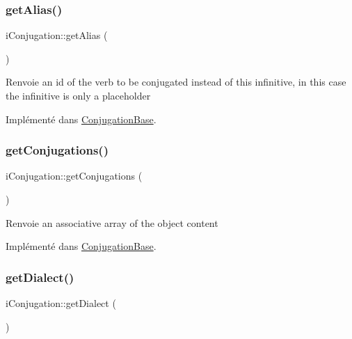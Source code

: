 \subsubsection{\texorpdfstring{get\+Alias()}{getAlias()}}
{\footnotesize\ttfamily i\+Conjugation\+::get\+Alias (\begin{DoxyParamCaption}{ }\end{DoxyParamCaption})}

\begin{DoxyReturn}{Renvoie}
an id of the verb to be conjugated instead of this infinitive, in this case the infinitive is only a placeholder 
\end{DoxyReturn}


Implémenté dans \hyperlink{classConjugationBase_ac8266b933fde0f494a7933c4d2fe0590}{Conjugation\+Base}.

\hypertarget{interfaceiConjugation_a6c0072d898eb8b2f3756c87dfed4af33}{}\label{interfaceiConjugation_a6c0072d898eb8b2f3756c87dfed4af33} 
\subsubsection{\texorpdfstring{get\+Conjugations()}{getConjugations()}}
{\footnotesize\ttfamily i\+Conjugation\+::get\+Conjugations (\begin{DoxyParamCaption}{ }\end{DoxyParamCaption})}

\begin{DoxyReturn}{Renvoie}
an associative array of the object content 
\end{DoxyReturn}


Implémenté dans \hyperlink{classConjugationBase_ae5b10d1201dfc7ed1c56b1f5a073bbdb}{Conjugation\+Base}.

\hypertarget{interfaceiConjugation_a4e0b6c0923ecd596b6acff6c7b776f5f}{}\label{interfaceiConjugation_a4e0b6c0923ecd596b6acff6c7b776f5f} 
\subsubsection{\texorpdfstring{get\+Dialect()}{getDialect()}}
{\footnotesize\ttfamily i\+Conjugation\+::get\+Dialect (\begin{DoxyParamCaption}{ }\end{DoxyParamCaption})}

